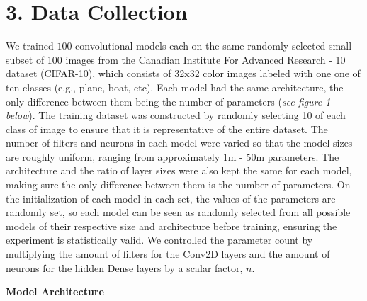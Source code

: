 \documentclass[12pt]{article}
\begin{document}
    \section*{3. Data Collection}

    We trained $100$ convolutional models each on the same randomly selected small subset of 100 images
    from the Canadian Institute For Advanced Research - 10 dataset (CIFAR-10), which consists of 32x32 color images labeled with one one of ten classes (e.g., plane, boat, etc).
    Each model had the same architecture, the only difference between them being the number of parameters (\textit{see figure 1 below}).
    The training dataset was constructed by randomly selecting 10 of each class of image to ensure that it is representative of the entire dataset.
    The number of filters and neurons in each model were varied so that the model sizes are roughly uniform, ranging from approximately 1m - 50m parameters.
    The architecture and the ratio of layer sizes were also kept the same for each model, making sure the only difference between them is the number of parameters.
    On the initialization of each model in each set, the values of the parameters are randomly set, so each model can be seen as randomly
    selected from all possible models of their respective size and architecture before training, ensuring the experiment is statistically valid.
    We controlled the parameter count by multiplying the amount of filters for the Conv2D layers and the amount of neurons
    for the hidden Dense layers by a scalar factor, $n$.

    \noindent\textbf{Model Architecture}
    \begin{center}
    \end{center}
\end{document}
